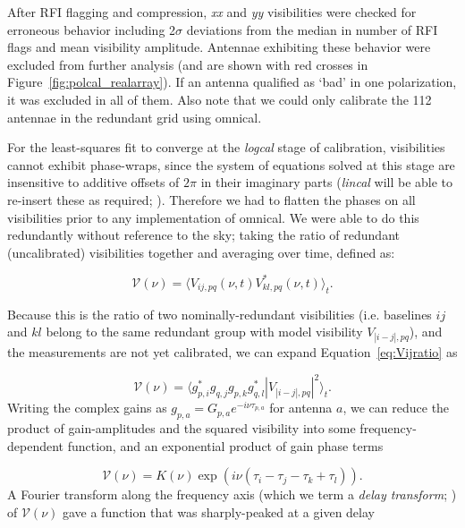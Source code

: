 After RFI flagging and compression, \textit{xx} and \textit{yy} visibilities were checked for erroneous behavior including 2$\sigma$ deviations from the median in number of RFI flags and mean visibility amplitude. Antennae exhibiting these behavior were excluded from further analysis (and are shown with red crosses in Figure~\ref{fig:polcal_realarray}). If an antenna qualified as `bad' in one polarization, it was excluded in all of them. Also note that we could only calibrate the 112 antennae in the redundant grid using {\sc omnical}.

For the least-squares fit to converge at the \textit{logcal} stage of calibration, visibilities cannot exhibit phase-wraps, since the system of equations solved at this stage are insensitive to additive offsets of $2\pi$ in their imaginary parts (\textit{lincal} will be able to re-insert these as required; \citealt{Liu.10}). Therefore we had to flatten the phases on all visibilities prior to any implementation of {\sc omnical}. We were able to do this redundantly without reference to the sky; taking the ratio of redundant (uncalibrated) visibilities together and averaging over time, defined as:

\begin{equation}
\mathcal{V}(\nu) = \langle V_{ij, pq}(\nu,t)V^*_{kl, pq}(\nu,t) \rangle_t .
\label{eq:Vijratio}
\end{equation}

Because this is the ratio of two nominally-redundant visibilities (i.e. baselines $ij$ and $kl$ belong to the same redundant group with model visibility $V_{|i-j|,pq}$), and the measurements are not yet calibrated, we can expand Equation~\ref{eq:Vijratio} as

\begin{equation}
\mathcal{V}(\nu) = \langle g^*_{p,i}g_{q,j}g_{p,k}g^*_{q,l} |V_{|i-j|,pq}|^2 \rangle_t .
\end{equation}
Writing the complex gains as $g_{p,a}=G_{p,a} e^{-i\nu\tau_{p,a}}$ for antenna $a$, we can reduce the product of gain-amplitudes and the squared visibility into some frequency-dependent function, and an exponential product of gain phase terms

\begin{equation}
\mathcal{V}(\nu) = K(\nu)\exp\left(i\nu (\tau_i - \tau_j - \tau_k + \tau_l)\right) .
\end{equation}
A Fourier transform along the frequency axis (which we term a \textit{delay transform}; \citealt{Parsons.12a}) of $\mathcal{V}(\nu)$ gave a function that was sharply-peaked at a given delay

